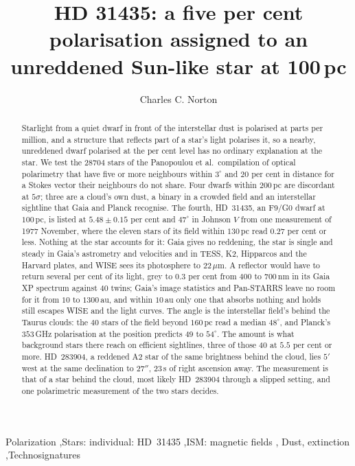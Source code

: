 \documentclass[3p,11pt]{elsarticle}
\newcommand{\um}{\,$\mu$m}
\begin{document}
\begin{frontmatter}

\title{HD 31435: a five per cent polarisation assigned to an unreddened Sun-like star at 100\,pc}

\author{Charles C. Norton}

\begin{abstract}
Starlight from a quiet dwarf in front of the interstellar dust is polarised at parts
per million, and a structure that reflects part of a star's light polarises it, so a
nearby, unreddened dwarf polarised at the per cent level has no ordinary explanation at
the star. We test the $28704$ stars of the Panopoulou et al.\ compilation of optical
polarimetry that have five or more neighbours within $3^\circ$ and $20$ per cent in
distance for a Stokes vector their neighbours do not share. Four dwarfs within
$200$\,pc are discordant at $5\sigma$; three are a cloud's own dust, a binary in a
crowded field and an interstellar sightline that Gaia and Planck recognise. The fourth,
HD~31435, an F9/G0 dwarf at $100$\,pc, is listed at $5.48\pm0.15$ per cent and
$47^\circ$ in Johnson $V$ from one measurement of 1977 November, where the eleven
stars of its field within $130$\,pc read $0.27$ per cent or less. Nothing at the star
accounts for it: Gaia gives no reddening, the star is single and steady in Gaia's
astrometry and velocities and in TESS, K2, Hipparcos and the Harvard plates, and WISE
sees its photosphere to $22$\um. A reflector would have to return several per cent of
its light, grey to $0.3$ per cent from $400$ to $700$\,nm in its Gaia XP spectrum
against $40$ twins; Gaia's image statistics and Pan-STARRS leave no room for it from
$10$ to $1300$\,au, and within $10$\,au only one that absorbs nothing and holds still
escapes WISE and the light curves. The angle is the interstellar field's behind the
Taurus clouds: the $40$ stars of the field beyond $160$\,pc read a median $48^\circ$,
and Planck's $353$\,GHz polarisation at the position predicts $49$ to $54^\circ$. The
amount is what background stars there reach on efficient sightlines, three of those
$40$ at $5.5$ per cent or more. HD~283904, a reddened A2 star of the same brightness
behind the cloud, lies $5'$ west at the same declination to $27''$, $23$\,s of right
ascension away. The measurement is that of a star behind the cloud, most likely
HD~283904 through a slipped setting, and one polarimetric measurement of the two stars
decides.
\end{abstract}

\begin{keyword}
Polarization \sep Stars: individual: HD~31435 \sep ISM: magnetic fields \sep
Dust, extinction \sep Technosignatures
\end{keyword}

\end{frontmatter}
\end{document}
